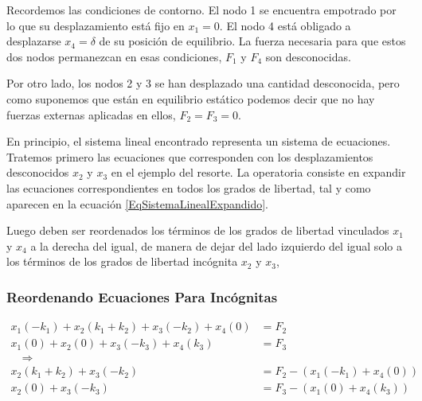 
Recordemos las condiciones de contorno. El nodo 1 se encuentra empotrado por lo
que su desplazamiento está fijo en $x_1=0$. El nodo 4 está obligado a
desplazarse $x_4 = \delta$ de su posición de equilibrio.  La fuerza necesaria
para que estos dos nodos permanezcan en esas condiciones, $F_1$ y $F_4$ son
desconocidas. 

Por otro lado, los nodos 2 y 3 se han desplazado una cantidad desconocida, pero
como suponemos que están en equilibrio estático podemos decir que no hay
fuerzas externas aplicadas en ellos, $F_2 = F_3 = 0$.

En principio, el sistema lineal encontrado representa un sistema de ecuaciones.
Tratemos primero las ecuaciones que corresponden con los desplazamientos
desconocidos $x_2$ y $x_3$ en el ejemplo del resorte. La operatoria consiste en
expandir las ecuaciones correspondientes en todos los grados de libertad, tal y
como aparecen en la ecuación \ref{EqSistemaLinealExpandido}.

Luego deben ser reordenados los términos de los grados de libertad vinculados
$x_1$ y $x_4$ a la derecha del igual, de manera de dejar del lado izquierdo del
igual solo a los términos de los grados de libertad incógnita $x_2$ y $x_3$, 

\mode*


\begin{frame}[label=FrameReordenarEcuaciones23]
  \frametitle<presentation>{Reordenando Ecuaciones Para Incógnitas}
\begin{equation}  \label{EqReordenoIncognitas}
    \begin{aligned}
        x_1 (-k_1) + x_2(k_1+k_2)+ x_3(-k_2) + x_4(0) &= F_2\\
       x_1 (0) + x_2(0)+ x_3(-k_3) + x_4(k_3)         &= F_3 \\
      \quad \Rightarrow \quad & \\
	 x_2(k_1+k_2)+ x_3(-k_2) &= F_2  - (x_1 (-k_1) +  x_4(0)   )\\
         x_2(0)      + x_3(-k_3) &= F_3  - (x_1 (0)    +  x_4(k_3) )
    \end{aligned}
\end{equation}

\end{frame}


